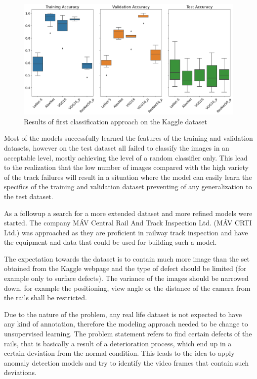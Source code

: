 \begin{figure}[H]
    \centering
    \includegraphics[width=\textwidth]{./tex_images/bootstrap_results.png}
    \caption{Results of first classification approach on the Kaggle dataset}
    \label{fig:Kaggle_results}
\end{figure}

Most of the models successfully learned the features of the training and validation datasets,
however on the test dataset all failed to classify the images in an acceptable level, mostly
achieving the level of a random classifier only.
This lead to the realization that the low number of images compared with the high variety of the track
failures will result in a situation where the model can easily learn the specifics of the training and
validation dataset preventing of any generalization to the test dataset.

As a followup a search for a more extended dataset and more refined models were started.
The company MÁV Central Rail And Track Inspection Ltd. (MÁV CRTI Ltd.) \cite{_mav_} was approached
as they are proficient in railway track inspection and have the equipment and data that could be used
for building such a model.

The expectation towards the dataset is to contain much more image than the set obtained from the
Kaggle webpage and the type of defect should be limited (for example only to surface defects).
The variance of the images should be narrowed down, for example the positioning, view angle or the
distance of the camera from the rails shall be restricted.

Due to the nature of the problem, any real life dataset is not expected to have any kind of annotation,
therefore the modeling approach needed to be change to unsupervised learning.
The problem statement refers to find certain defects of the rails, that is basically a result of a
deterioration process, which end up in a certain deviation from the normal condition.
This leads to the idea to apply anomaly detection models and try to identify the video frames
that contain such deviations.

